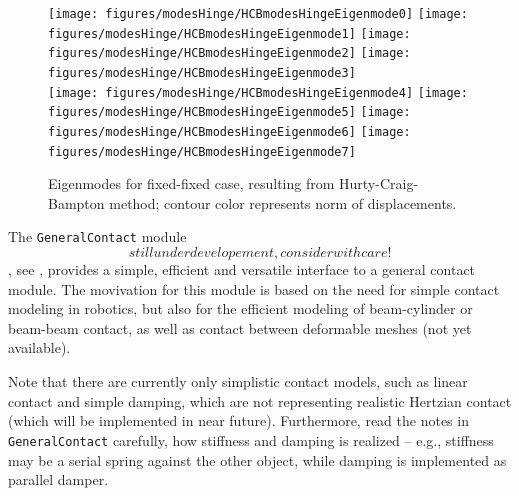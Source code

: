 \begin{figure}[tbph]
  \begin{center}
  \texttt{[image: figures/modesHinge/HCBmodesHingeEigenmode0]}
  \texttt{[image: figures/modesHinge/HCBmodesHingeEigenmode1]}
  \texttt{[image: figures/modesHinge/HCBmodesHingeEigenmode2]}
  \texttt{[image: figures/modesHinge/HCBmodesHingeEigenmode3]}\\
  \texttt{[image: figures/modesHinge/HCBmodesHingeEigenmode4]}
  \texttt{[image: figures/modesHinge/HCBmodesHingeEigenmode5]}
  \texttt{[image: figures/modesHinge/HCBmodesHingeEigenmode6]}
  \texttt{[image: figures/modesHinge/HCBmodesHingeEigenmode7]}
  \end{center}
  \caption{Eigenmodes for fixed-fixed case, resulting from Hurty-Craig-Bampton method; contour color represents norm of displacements.}
	\label{fig_hingePartFixedFixedModes}
\end{figure}










\clearpage
\label{secContactTheory}
% 
The \texttt{GeneralContact} module \[still under developement, consider with care!\], see , provides a simple, efficient and versatile interface to a general contact module. The movivation for this module is based on the need for simple contact modeling in robotics, but also for the efficient modeling of beam-cylinder or beam-beam contact, as well as contact between deformable meshes (not yet available).

Note that there are currently only simplistic contact models, such as linear contact and simple damping, which are not representing realistic Hertzian contact (which will be implemented in near future). Furthermore, read the notes in \texttt{GeneralContact} carefully, how stiffness and damping is realized -- e.g., stiffness may be a serial spring against the other object, while damping is implemented as parallel damper.

